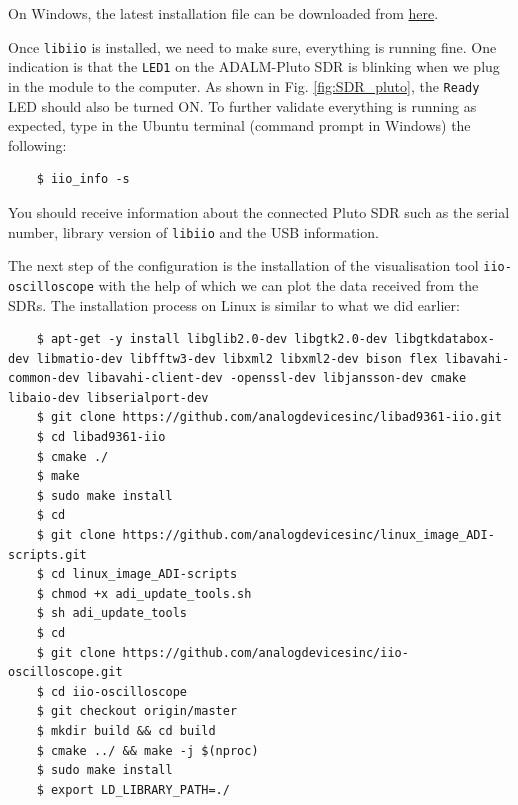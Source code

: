 \documentclass[11pt]{article}
\begin{document}
\begin{tcolorbox}[colback=blue!5]
  On Windows, the latest installation file can be downloaded from \href{https://github.com/analogdevicesinc/libiio/releases}{here}.
\end{tcolorbox}
 


Once \texttt{libiio} is installed, we need to make sure, everything is running fine. One indication is that the \texttt{LED1} on the ADALM-Pluto SDR is blinking when we plug in the module to the computer. As shown in Fig. \ref{fig:SDR_pluto}, the \texttt{Ready} LED should also be turned ON. To further validate everything is running as expected, type in the Ubuntu terminal (command prompt in Windows) the following:

\begin{mdframed}[backgroundcolor=gray!20]
  \tiny
  \begin{verbatim}
    $ iio_info -s
  \end{verbatim}
\end{mdframed}

You should receive information about the connected Pluto SDR such as the serial number, library version of \texttt{libiio} and the USB information. 

The next step of the configuration is the installation of the visualisation tool \texttt{iio-oscilloscope} with the help of which we can plot the data received from the SDRs. The installation process on Linux is similar to what we did earlier:

\begin{mdframed}[backgroundcolor=gray!20]
  \tiny
  \begin{verbatim}
    $ apt-get -y install libglib2.0-dev libgtk2.0-dev libgtkdatabox-dev libmatio-dev libfftw3-dev libxml2 libxml2-dev bison flex libavahi-common-dev libavahi-client-dev -openssl-dev libjansson-dev cmake libaio-dev libserialport-dev
    $ git clone https://github.com/analogdevicesinc/libad9361-iio.git
    $ cd libad9361-iio
    $ cmake ./
    $ make
    $ sudo make install
    $ cd 
    $ git clone https://github.com/analogdevicesinc/linux_image_ADI-scripts.git
    $ cd linux_image_ADI-scripts
    $ chmod +x adi_update_tools.sh
    $ sh adi_update_tools
    $ cd 
    $ git clone https://github.com/analogdevicesinc/iio-oscilloscope.git
    $ cd iio-oscilloscope
    $ git checkout origin/master
    $ mkdir build && cd build
    $ cmake ../ && make -j $(nproc)
    $ sudo make install
    $ export LD_LIBRARY_PATH=./
  \end{verbatim}
\end{mdframed}
\end{document}
